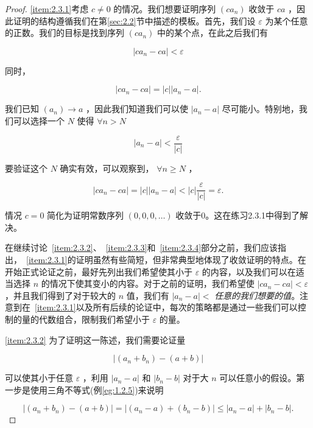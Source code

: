 \begin{proof}
  \ref{item:2.3.1}考虑 \(c \neq  0\) 的情况。我们想要证明序列 \(\left( {c{a}_{n}}\right)\) 收敛于 \({ca}\) ，因此证明的结构遵循我们在第\ref{sec:2.2}节中描述的模板。首先，我们设 \(\varepsilon\) 为某个任意的正数。我们的目标是找到序列 \(\left( {c{a}_{n}}\right)\) 中的某个点，在此之后我们有

\[
\left| {c{a}_{n} - {ca}}\right|  < \varepsilon
\]

同时，

\[
\left| {c{a}_{n} - {ca}}\right|  = \left| c\right| \left| {{a}_{n} - a}\right| .
\]

我们已知 \(\left( {a}_{n}\right)  \rightarrow  a\) ，因此我们知道我们可以使 \(\left| {{a}_{n} - a}\right|\) 尽可能小。特别地，我们可以选择一个 \(N\) 使得 $\forall n> N$

\[
\left| {{a}_{n} - a}\right|  < \frac{\varepsilon }{\left| c\right| }
\]

要验证这个 \(N\) 确实有效，可以观察到， \(\forall n \geq  N\) ，

\[
\left| {c{a}_{n} - {ca}}\right|  = \left| c\right| \left| {{a}_{n} - a}\right|  < \left| c\right| \frac{\varepsilon }{\left| c\right| } = \varepsilon .
\]

情况 \(c = 0\) 简化为证明常数序列 \(\left( {0,0,0,\ldots }\right)\) 收敛于0。这在练习2.3.1中得到了解决。

在继续讨论~\ref{item:2.3.2}、~\ref{item:2.3.3}和~\ref{item:2.3.4}部分之前，我们应该指出，~\ref{item:2.3.1}的证明虽然有些简短，但非常典型地体现了收敛证明的特点。在开始正式论证之前，最好先列出我们希望使其小于 \(\varepsilon\) 的内容，以及我们可以在适当选择 \(n\) 的情况下使其变小的内容。对于之前的证明，我们希望使 \(\left| {c{a}_{n} - {ca}}\right|  < \varepsilon\) ，并且我们得到了对于较大的 $n$ 值，我们有 \(\left| {{a}_{n} - a}\right|  <\) \textit{任意的我们想要的值}。注意到在~\ref{item:2.3.1}以及所有后续的论证中，每次的策略都是通过一些我们可以控制的量的代数组合，限制我们希望小于 \(\varepsilon\) 的量。

\ref{item:2.3.2} 为了证明这一陈述，我们需要论证量

\[
\left| {\left( {{a}_{n} + {b}_{n}}\right)  - \left( {a + b}\right) }\right|
\]

可以使其小于任意 \(\varepsilon\) ，利用 \(\left| {{a}_{n} - a}\right|\) 和 \(\left| {{b}_{n} - b}\right|\) 对于大 \(n\) 可以任意小的假设。第一步是使用三角不等式(例\ref{eg:1.2.5})来说明

\[
\left| {\left( {{a}_{n} + {b}_{n}}\right)  - \left( {a + b}\right) }\right|  = \left| {\left( {{a}_{n} - a}\right)  + \left( {{b}_{n} - b}\right) }\right|  \leq  \left| {{a}_{n} - a}\right|  + \left| {{b}_{n} - b}\right| .
\]


\end{proof}
